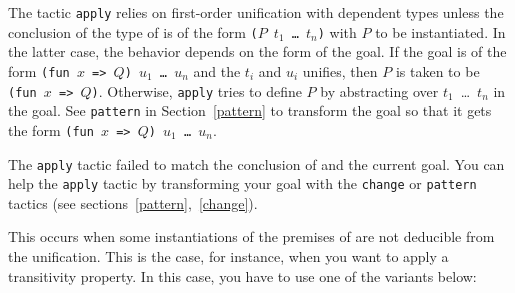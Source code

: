 \begin{coq_example*}
The tactic {\tt apply} relies on first-order unification with
dependent types unless the conclusion of the type of {\term} is of the
form {\tt ($P$ $t_1$ \dots\ $t_n$)} with $P$ to be instantiated.  In
the latter case, the behavior depends on the form of the goal. If the
goal is of the form {\tt (fun $x$ => $Q$)~$u_1$~\ldots~$u_n$} and the
$t_i$ and $u_i$ unifies, then $P$ is taken to be {\tt (fun $x$ => $Q$)}.
Otherwise, {\tt apply} tries to define $P$ by abstracting over
$t_1$~\ldots ~$t_n$ in the goal. See {\tt pattern} in
Section~\ref{pattern} to transform the goal so that it gets the form
{\tt (fun $x$ => $Q$)~$u_1$~\ldots~$u_n$}.

\begin{ErrMsgs}
\item {}

  The {\tt apply}
  tactic failed to match the conclusion of {\term} and the current goal.
  You can help the {\tt apply} tactic by transforming your
  goal with the {\tt change} or {\tt pattern} tactics (see
  sections~\ref{pattern},~\ref{change}).

\item {}

  This occurs when some instantiations of the premises of {\term} are not
  deducible from the unification. This is the case, for instance, when
  you want to apply a transitivity property. In this case, you have to
  use one of the variants below:

\end{ErrMsgs}

\end{coq_example*}
